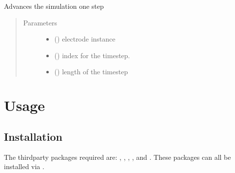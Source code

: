 \documentclass[letterpaper,10pt,english]{sphinxmanual}
\begin{document}
\begin{fulllineitems}
\label{\detokenize{solver:solver.simulation_step}}
\sphinxAtStartPar
Advances the simulation one step
\begin{quote}\begin{description}
\item[{Parameters}] \leavevmode\begin{itemize}
\item {} 
\sphinxAtStartPar
{} (\sphinxstyleliteralemphasis{\sphinxupquote{{[}}}\sphinxstyleliteralemphasis{\sphinxupquote{{]}}}) \textendash{} electrode instance

\item {} 
\sphinxAtStartPar
{} (\sphinxstyleliteralemphasis{\sphinxupquote{{[}}}\sphinxstyleliteralemphasis{\sphinxupquote{{]}}}) \textendash{} index for the timestep.

\item {} 
\sphinxAtStartPar
{} (\sphinxstyleliteralemphasis{\sphinxupquote{{[}}}\sphinxstyleliteralemphasis{\sphinxupquote{{]}}}) \textendash{} length of the timestep

\end{itemize}

\end{description}\end{quote}

\end{fulllineitems}



\chapter{Usage}
\label{\detokenize{usage:usage}}\label{\detokenize{usage::doc}}

\section{Installation}
\label{\detokenize{usage:installation}}\label{\detokenize{usage:id1}}
\sphinxAtStartPar
The third\sphinxhyphen{}party packages required are: , , ,
, and . These packages can all be installed via .
\end{document}
